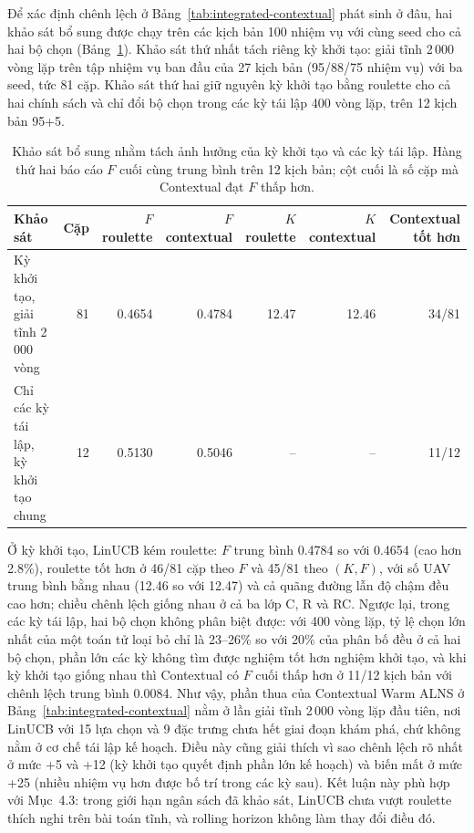 \documentclass[11pt,a4paper]{article}
\begin{document}
Để xác định chênh lệch ở Bảng~\ref{tab:integrated-contextual} phát sinh ở đâu, hai khảo sát bổ sung được chạy trên các kịch bản 100 nhiệm vụ với cùng seed cho cả hai bộ chọn (Bảng~\ref{tab:bandit-diagnosis}). Khảo sát thứ nhất tách riêng kỳ khởi tạo: giải tĩnh 2\,000 vòng lặp trên tập nhiệm vụ ban đầu của 27 kịch bản (95/88/75 nhiệm vụ) với ba seed, tức 81 cặp. Khảo sát thứ hai giữ nguyên kỳ khởi tạo bằng roulette cho cả hai chính sách và chỉ đổi bộ chọn trong các kỳ tái lập 400 vòng lặp, trên 12 kịch bản 95+5.

\begin{table}[htbp]
\centering\scriptsize
\caption{Khảo sát bổ sung nhằm tách ảnh hưởng của kỳ khởi tạo và các kỳ tái lập. Hàng thứ hai báo cáo $F$ cuối cùng trung bình trên 12 kịch bản; cột cuối là số cặp mà Contextual đạt $F$ thấp hơn.}
\begin{tabular}{@{}lrrrrrr@{}}
\toprule
Khảo sát & Cặp & $F$ roulette & $F$ contextual & $K$ roulette & $K$ contextual & Contextual tốt hơn\\\midrule
Kỳ khởi tạo, giải tĩnh 2\,000 vòng & 81 & 0.4654 & 0.4784 & 12.47 & 12.46 & 34/81\\
Chỉ các kỳ tái lập, kỳ khởi tạo chung & 12 & 0.5130 & 0.5046 & -- & -- & 11/12\\
\bottomrule
\end{tabular}
\label{tab:bandit-diagnosis}
\end{table}

Ở kỳ khởi tạo, LinUCB kém roulette: $F$ trung bình 0.4784 so với 0.4654 (cao hơn 2.8\%), roulette tốt hơn ở 46/81 cặp theo $F$ và 45/81 theo $(K,F)$, với số UAV trung bình bằng nhau (12.46 so với 12.47) và cả quãng đường lẫn độ chậm đều cao hơn; chiều chênh lệch giống nhau ở cả ba lớp C, R và RC. Ngược lại, trong các kỳ tái lập, hai bộ chọn không phân biệt được: với 400 vòng lặp, tỷ lệ chọn lớn nhất của một toán tử loại bỏ chỉ là 23--26\% so với 20\% của phân bố đều ở cả hai bộ chọn, phần lớn các kỳ không tìm được nghiệm tốt hơn nghiệm khởi tạo, và khi kỳ khởi tạo giống nhau thì Contextual có $F$ cuối thấp hơn ở 11/12 kịch bản với chênh lệch trung bình 0.0084. Như vậy, phần thua của Contextual Warm ALNS ở Bảng~\ref{tab:integrated-contextual} nằm ở lần giải tĩnh 2\,000 vòng lặp đầu tiên, nơi LinUCB với 15 lựa chọn và 9 đặc trưng chưa hết giai đoạn khám phá, chứ không nằm ở cơ chế tái lập kế hoạch. Điều này cũng giải thích vì sao chênh lệch rõ nhất ở mức +5 và +12 (kỳ khởi tạo quyết định phần lớn kế hoạch) và biến mất ở mức +25 (nhiều nhiệm vụ hơn được bố trí trong các kỳ sau). Kết luận này phù hợp với Mục~4.3: trong giới hạn ngân sách đã khảo sát, LinUCB chưa vượt roulette thích nghi trên bài toán tĩnh, và rolling horizon không làm thay đổi điều đó.
\end{document}

